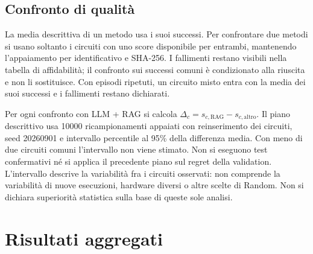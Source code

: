 \subsection{Confronto di qualità}
La media descrittiva di un metodo usa i suoi successi. Per confrontare due metodi
si usano soltanto i circuiti con uno score disponibile per entrambi, mantenendo
l'appaiamento per identificativo e SHA-256. I fallimenti restano visibili nella
tabella di affidabilità; il confronto sui successi comuni è condizionato alla
riuscita e non li sostituisce. Con episodi ripetuti, un circuito misto entra con
la media dei suoi successi e i fallimenti restano dichiarati.

Per ogni confronto con LLM + RAG si calcola
\(\Delta_c=s_{c,\mathrm{RAG}}-s_{c,\mathrm{altro}}\).
Il piano descrittivo usa 10000 ricampionamenti appaiati con reinserimento dei
circuiti, seed 20260901 e intervallo percentile al 95\% della differenza media.
Con meno di due circuiti comuni l'intervallo non viene stimato. Non si eseguono
test confermativi né si applica il precedente piano sul regret della validation.
L'intervallo descrive la variabilità fra i circuiti osservati: non comprende la
variabilità di nuove esecuzioni, hardware diversi o altre scelte di Random.
Non si dichiara superiorità statistica sulla base di queste sole analisi.
\section{Risultati aggregati}
